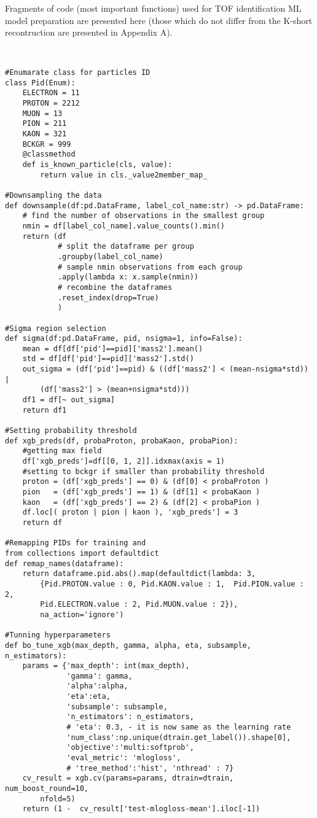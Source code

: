\pagestyle{fancy}
\thispagestyle{fancy}

Fragments of code (most important functions) used for TOF identification ML model preparation are presented here (those which do not differ from the K-short recontruction are presented in Appendix A).

\lstset{language=Python}
\begin{lstlisting}


#Enumarate class for particles ID
class Pid(Enum):
    ELECTRON = 11
    PROTON = 2212 
    MUON = 13
    PION = 211
    KAON = 321
    BCKGR = 999
    @classmethod
    def is_known_particle(cls, value):
        return value in cls._value2member_map_ 
        
#Downsampling the data
def downsample(df:pd.DataFrame, label_col_name:str) -> pd.DataFrame:
    # find the number of observations in the smallest group
    nmin = df[label_col_name].value_counts().min()
    return (df
            # split the dataframe per group
            .groupby(label_col_name)
            # sample nmin observations from each group
            .apply(lambda x: x.sample(nmin))
            # recombine the dataframes
            .reset_index(drop=True)
            )
            
#Sigma region selection
def sigma(df:pd.DataFrame, pid, nsigma=1, info=False):
    mean = df[df['pid']==pid]['mass2'].mean()
    std = df[df['pid']==pid]['mass2'].std()
    out_sigma = (df['pid']==pid) & ((df['mass2'] < (mean-nsigma*std)) | 
        (df['mass2'] > (mean+nsigma*std)))
    df1 = df[~ out_sigma]
    return df1

#Setting probability threshold
def xgb_preds(df, probaProton, probaKaon, probaPion):
    #getting max field
    df['xgb_preds']=df[[0, 1, 2]].idxmax(axis = 1)
    #setting to bckgr if smaller than probability threshold
    proton = (df['xgb_preds'] == 0) & (df[0] < probaProton )
    pion   = (df['xgb_preds'] == 1) & (df[1] < probaKaon )
    kaon   = (df['xgb_preds'] == 2) & (df[2] < probaPion )
    df.loc[( proton | pion | kaon ), 'xgb_preds'] = 3
    return df

#Remapping PIDs for training and 
from collections import defaultdict
def remap_names(dataframe):
    return dataframe.pid.abs().map(defaultdict(lambda: 3, 
        {Pid.PROTON.value : 0, Pid.KAON.value : 1,  Pid.PION.value : 2, 
        Pid.ELECTRON.value : 2, Pid.MUON.value : 2}),
        na_action='ignore')
 
#Tunning hyperparameters
def bo_tune_xgb(max_depth, gamma, alpha, eta, subsample, n_estimators):
    params = {'max_depth': int(max_depth),
              'gamma': gamma,
              'alpha':alpha,
              'eta':eta,
              'subsample': subsample,
              'n_estimators': n_estimators,
              # 'eta': 0.3, - it is now same as the learning rate
              'num_class':np.unique(dtrain.get_label()).shape[0],
              'objective':'multi:softprob', 
              'eval_metric': 'mlogloss',
              # 'tree_method':'hist', 'nthread' : 7}
    cv_result = xgb.cv(params=params, dtrain=dtrain, num_boost_round=10, 
        nfold=5)
    return (1 -  cv_result['test-mlogloss-mean'].iloc[-1])
    



\end{lstlisting}